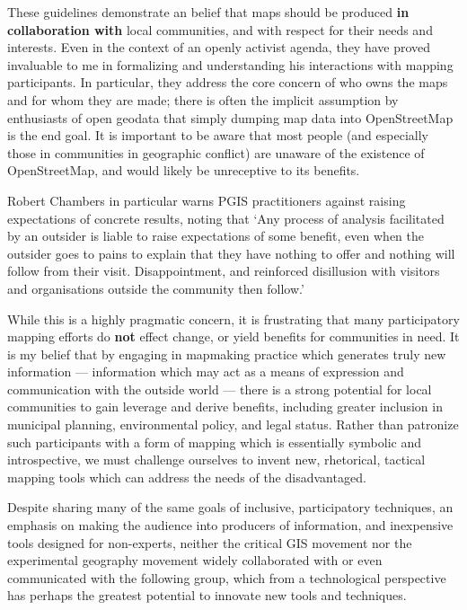 \documentclass[11pt,oneside,notitlepage]{report}
\begin{document}
These guidelines demonstrate an belief that maps should be produced \textbf{in collaboration with} local communities, and with respect for their needs and interests. Even in the context of an openly activist agenda, they have proved invaluable to me in formalizing and understanding his interactions with mapping participants. In particular, they address the core concern of who owns the maps and for whom they are made; there is often the implicit assumption by enthusiasts of open geodata that simply dumping map data into OpenStreetMap is the end goal. It is important to be aware that most people (and especially those in communities in geographic conflict) are unaware of the existence of OpenStreetMap, and would likely be unreceptive to its benefits. 

Robert Chambers in particular warns \ac{PGIS} practitioners against raising expectations of concrete results, noting that `Any process of analysis facilitated by an outsider is liable to raise expectations of some benefit, even when the outsider goes to pains to explain that they have nothing to offer and nothing will follow from their visit. Disappointment, and reinforced disillusion with visitors and organisations outside the community then follow.' \cite{chambers2006whose}

While this is a highly pragmatic concern, it is frustrating that many participatory mapping efforts do \textbf{not} effect change, or yield benefits for communities in need. It is my belief that by engaging in mapmaking practice which generates truly new information --- information which may act as a means of expression and communication with the outside world --- there is a strong potential for local communities to gain leverage and derive benefits, including greater inclusion in municipal planning, environmental policy, and legal status. Rather than patronize such participants with a form of mapping which is essentially symbolic and introspective, we must challenge ourselves to invent new, rhetorical, tactical mapping tools which can address the needs of the disadvantaged.  

Despite sharing many of the same goals of inclusive, participatory techniques, an emphasis on making the audience into producers of information, and inexpensive tools designed for non-experts, neither the critical GIS movement nor the experimental geography movement widely collaborated with or even communicated with the following group, which from a technological perspective has perhaps the greatest potential to innovate new tools and techniques. 
\end{document}
